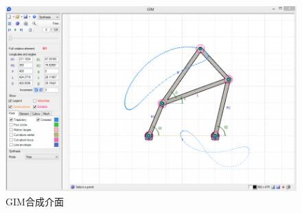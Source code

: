 \documentclass[14pt,a4paper]{report}  %
\begin{document}
        \begin{figure}[H]
        \centering
        \includegraphics[scale=0.8]{GIM.png} 
        \caption{GIM合成介面} 
        \label{fig_GIM:scale}
    	\end{figure}
\newpage

\end{document}
